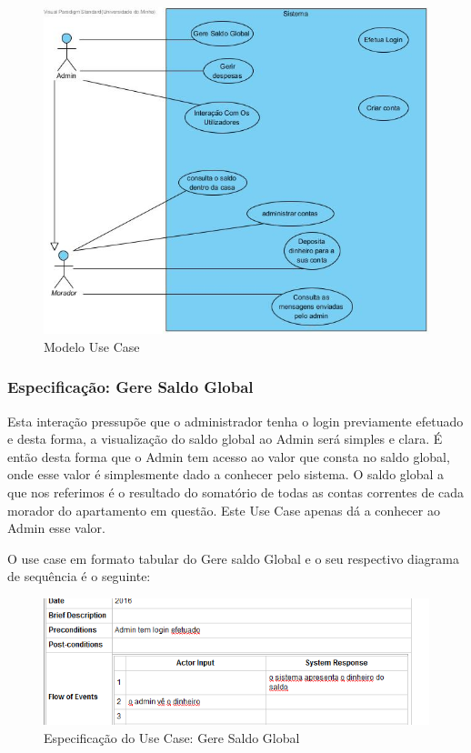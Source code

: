 \begin{figure}[htb!]
	\centering
	\includegraphics[scale=0.5]{imagens/useCase/UseCase}  
	\caption{Modelo Use Case}  
\end{figure}

\newpage
\subsubsection{Especificação: Gere Saldo Global }

Esta interação pressupõe que o administrador  tenha o login previamente efetuado e desta forma, a visualização do saldo global ao Admin será simples e clara. É então desta forma que o Admin tem acesso ao valor que consta no saldo global, onde esse valor é simplesmente dado a conhecer pelo sistema. O saldo global a que nos referimos é o resultado do somatório de todas as contas correntes de cada morador do apartamento em questão. Este Use Case apenas dá a conhecer ao Admin esse valor.

O use case em formato tabular do Gere saldo Global e o seu respectivo diagrama de sequência é o seguinte:

\begin{figure}[htb!]
	\centering
	\includegraphics[scale=0.6]{imagens/Especificacoes/geresaldoglobal}  
	\caption{Especificação do Use Case: Gere Saldo Global  }  
\end{figure}

